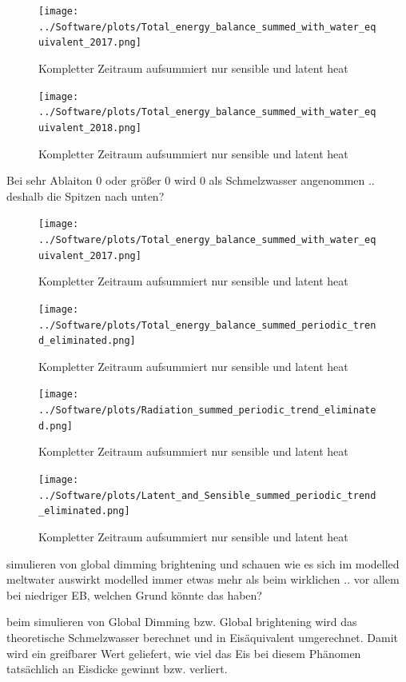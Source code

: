 \documentclass[12pt,a4paper]{article}
\begin{document}
\begin{figure}[H]
\centering
\texttt{[image: ../Software/plots/Total\_energy\_balance\_summed\_with\_water\_equivalent\_2017.png]}
\caption{Kompletter Zeitraum aufsummiert nur sensible und latent heat}
\label{fig:..}
\end{figure}

\begin{figure}[H]
\centering
\texttt{[image: ../Software/plots/Total\_energy\_balance\_summed\_with\_water\_equivalent\_2018.png]}
\caption{Kompletter Zeitraum aufsummiert nur sensible und latent heat}
\label{fig:..}
\end{figure}


Bei sehr Ablaiton 0 oder größer 0 wird 0 als Schmelzwasser angenommen  .. deshalb die Spitzen nach unten?

\begin{figure}[H]
\centering
\texttt{[image: ../Software/plots/Total\_energy\_balance\_summed\_with\_water\_equivalent\_2017.png]}
\caption{Kompletter Zeitraum aufsummiert nur sensible und latent heat}
\label{fig:..}
\end{figure}




\begin{figure}[H]
\centering
\texttt{[image: ../Software/plots/Total\_energy\_balance\_summed\_periodic\_trend\_eliminated.png]}
\caption{Kompletter Zeitraum aufsummiert nur sensible und latent heat}
\label{fig:..}
\end{figure}

\begin{figure}[H]
\centering
\texttt{[image: ../Software/plots/Radiation\_summed\_periodic\_trend\_eliminated.png]}
\caption{Kompletter Zeitraum aufsummiert nur sensible und latent heat}
\label{fig:..}
\end{figure}

\begin{figure}[H]
\centering
\texttt{[image: ../Software/plots/Latent\_and\_Sensible\_summed\_periodic\_trend\_eliminated.png]}
\caption{Kompletter Zeitraum aufsummiert nur sensible und latent heat}
\label{fig:..}
\end{figure}



simulieren von global dimming brightening und schauen wie es sich im modelled meltwater auswirkt
modelled immer etwas mehr als beim wirklichen .. vor allem bei niedriger EB, welchen Grund könnte das haben?

beim simulieren von Global Dimming bzw. Global brightening wird das theoretische Schmelzwasser berechnet und in Eisäquivalent umgerechnet. Damit wird ein greifbarer Wert geliefert, wie viel das Eis bei diesem Phänomen tatsächlich an Eisdicke gewinnt bzw. verliert.
\end{document}
